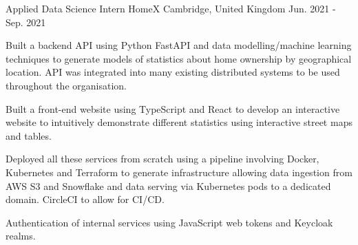 

\begin{cventries}

  \cventry
    {Applied Data Science Intern} %
    {HomeX} %
    {Cambridge, United Kingdom} %
    {Jun. 2021 - Sep. 2021} %
    {
      \begin{cvitems} %
        \item {Built a backend API using Python FastAPI and data modelling/machine learning techniques to generate models of statistics about home ownership by geographical location. API was integrated into many existing distributed systems to be used throughout the organisation.}
        \item {Built a front-end website using TypeScript and React to develop an interactive website to intuitively demonstrate different statistics using interactive street maps and tables.}
        \item {Deployed all these services from scratch using a pipeline involving Docker, Kubernetes and Terraform to generate infrastructure allowing data ingestion from AWS S3 and Snowflake and data serving via Kubernetes pods to a dedicated domain. CircleCI to allow for CI/CD.}
        \item {Authentication of internal services using JavaScript web tokens and Keycloak realms.}
      \end{cvitems}
    }



\end{cventries}
